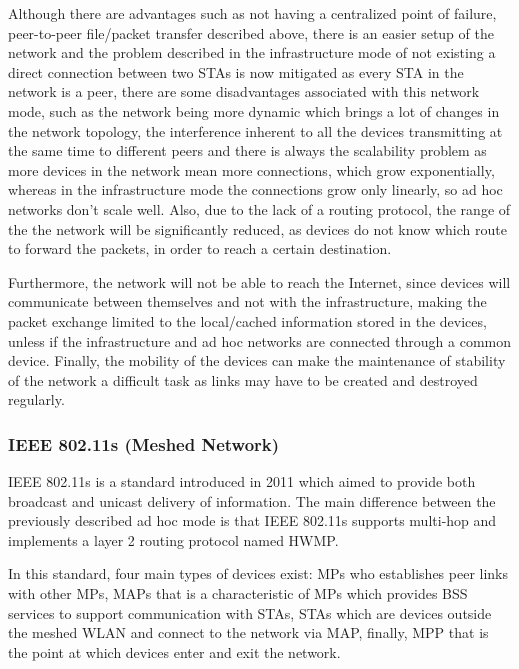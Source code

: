 Although there are advantages such as not having a centralized point of failure, peer-to-peer file/packet transfer described above, there is an easier setup of the network and the problem described in the infrastructure mode of not existing a direct connection between two \glspl{STA} is now mitigated as every \gls{STA} in the network is a peer, there are some disadvantages associated with this network mode, such as the network being more dynamic which brings a lot of changes in the network topology, the interference inherent to all the devices transmitting at the same time to different peers and there is always the scalability problem as more devices in the network mean more connections, which grow exponentially, whereas in the infrastructure mode the connections grow only linearly, so ad hoc networks don't scale well. Also, due to the lack of a routing protocol, the range of the the network will be significantly reduced, as devices do not know which route to forward the packets, in order to reach a certain destination.

Furthermore, the network will not be able to reach the Internet, since devices will communicate between themselves and not with the infrastructure, making the packet exchange limited to the local/cached information stored in the devices, unless if the infrastructure and ad hoc networks are connected through a common device. Finally, the mobility of the devices can make the maintenance of stability of the network a difficult task as links may have to be created and destroyed regularly.

\subsubsection{IEEE 802.11s (Meshed Network)}

IEEE 802.11s is a standard introduced in 2011 which aimed to provide both broadcast and unicast delivery of information. The main difference between the previously described ad hoc mode is that IEEE 802.11s supports multi-hop and implements a layer 2 routing protocol named \gls{HWMP}.

In this standard, four main types of devices exist: \glspl{MP} who establishes peer links with other \glspl{MP}, \glspl{MAP} that is a characteristic of \glspl{MP} which provides \gls{BSS} services to support communication with \glspl{STA}, \glspl{STA} which are devices outside the meshed \gls{WLAN} and connect to the network via \gls{MAP}, finally, \gls{MPP} that is the point at which devices enter and exit the network.

